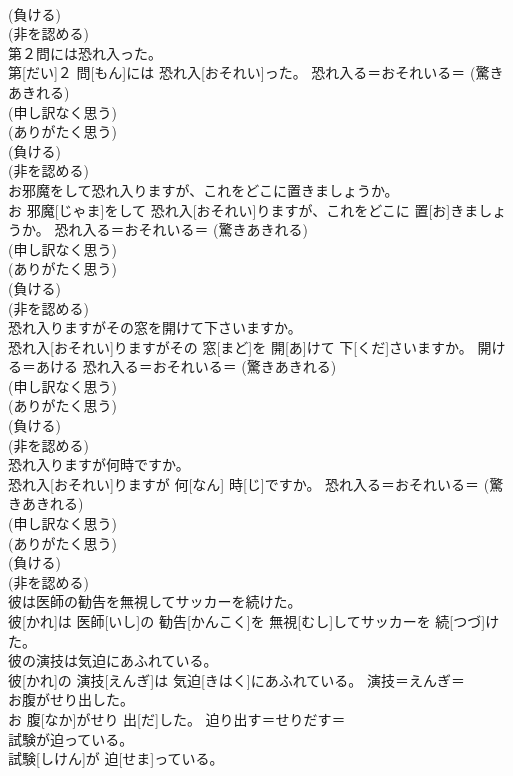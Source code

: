 \documentclass[8pt]{extreport}
\begin{document}
\begin{CJK}{UTF8}{min}
{\\	(負ける) 
\\	(非を認める) 
\\	第２問には恐れ入った。	
\\	第[だい]２ 問[もん]には 恐れ入[おそれい]った。	恐れ入る＝おそれいる＝ (驚きあきれる) 
\\	(申し訳なく思う) 
\\	(ありがたく思う) 
\\	(負ける) 
\\	(非を認める) 
\\	お邪魔をして恐れ入りますが、これをどこに置きましょうか。	
\\	お 邪魔[じゃま]をして 恐れ入[おそれい]りますが、これをどこに 置[お]きましょうか。	恐れ入る＝おそれいる＝ (驚きあきれる) 
\\	(申し訳なく思う) 
\\	(ありがたく思う) 
\\	(負ける) 
\\	(非を認める) 
\\	恐れ入りますがその窓を開けて下さいますか。	
\\	恐れ入[おそれい]りますがその 窓[まど]を 開[あ]けて 下[くだ]さいますか。	開ける＝あける 恐れ入る＝おそれいる＝ (驚きあきれる) 
\\	(申し訳なく思う) 
\\	(ありがたく思う) 
\\	(負ける) 
\\	(非を認める) 
\\	恐れ入りますが何時ですか。	
\\	恐れ入[おそれい]りますが 何[なん] 時[じ]ですか。	恐れ入る＝おそれいる＝ (驚きあきれる) 
\\	(申し訳なく思う) 
\\	(ありがたく思う) 
\\	(負ける) 
\\	(非を認める) 
\\	彼は医師の勧告を無視してサッカーを続けた。	
\\	彼[かれ]は 医師[いし]の 勧告[かんこく]を 無視[むし]してサッカーを 続[つづ]けた。	
\\	彼の演技は気迫にあふれている。	
\\	彼[かれ]の 演技[えんぎ]は 気迫[きはく]にあふれている。	演技＝えんぎ＝ 
\\	お腹がせり出した。	
\\	お 腹[なか]がせり 出[だ]した。	迫り出す＝せりだす＝ 
\\	試験が迫っている。	
\\	試験[しけん]が 迫[せま]っている。	
}
\end{CJK}
\end{document}
